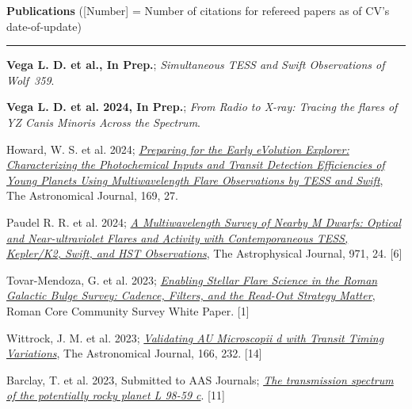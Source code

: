 \documentclass[letter,12pt]{article}
\begin{document}
\noindent
{\bf Publications} ([Number] = Number of citations for refereed papers as of CV's date-of-update) \\
\vspace{-10mm}
\begin{center}
\rule{\textwidth}{0.2mm}
\end{center}
\vspace{-3mm}
\noindent
\begin{etaremune}
\renewcommand\labelenumi{\bfseries\theenumi .}
\item {\bf Vega L. D. et al., In Prep.}; {\it Simultaneous TESS and Swift Observations of Wolf~359}.

\item {\bf Vega L. D. et al. 2024, In Prep.}; {\it From Radio to X-ray: Tracing the flares of YZ Canis Minoris Across the Spectrum}.

\item {Howard, W. S. et al. 2024;}
\href{https://ui.adsabs.harvard.edu/abs/2025AJ....169...27H/abstract}{\it Preparing for the Early eVolution Explorer: Characterizing the Photochemical Inputs and Transit Detection Efficiencies of Young Planets Using Multiwavelength Flare Observations by TESS and Swift}, The Astronomical Journal, 169, 27.

\item {Paudel R. R. et al. 2024}; 
\href{https://ui.adsabs.harvard.edu/abs/2024ApJ...971...24P/abstract}{\it A Multiwavelength Survey of Nearby M Dwarfs: Optical and Near-ultraviolet Flares and Activity with Contemporaneous TESS, Kepler/K2, {\it Swift}, and HST Observations}, The Astrophysical Journal, 971, 24. [6]

\item {Tovar-Mendoza, G. et al. 2023};
\href{https://ui.adsabs.harvard.edu/abs/2023arXiv230705806T/abstract}{\it Enabling Stellar Flare Science in the Roman Galactic Bulge Survey: Cadence, Filters, and the Read-Out Strategy Matter}, Roman Core Community Survey White Paper. [1]

\item {Wittrock, J. M. et al. 2023};
\href{https://ui.adsabs.harvard.edu/abs/2023arXiv230204922W/abstract}{\it Validating AU Microscopii d with Transit Timing Variations}, The Astronomical Journal, 166, 232. [14]

\item {Barclay, T. et al. 2023, Submitted to AAS Journals}; \href{https://ui.adsabs.harvard.edu/abs/2023arXiv230110866B/abstract}{\it The transmission spectrum of the potentially rocky planet L 98-59 c}. [11]


\end{etaremune}
\end{document}
